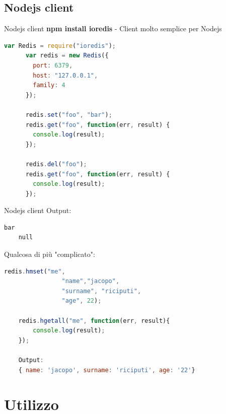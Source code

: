 \documentclass[xcolor=dvipsnames]{beamer}
\begin{document}
\subsection{Nodejs client}
\begin{frame}[fragile]{Nodejs client}
  \textbf{npm install ioredis} - Client molto semplice per Nodejs \\
  \begin{lstlisting}[language=JavaScript]
      var Redis = require("ioredis");
      var redis = new Redis({
        port: 6379,
        host: "127.0.0.1",
        family: 4
      });

      redis.set("foo", "bar");
      redis.get("foo", function(err, result) {
        console.log(result);
      });

      redis.del("foo");
      redis.get("foo", function(err, result) {
        console.log(result);
      });
  \end{lstlisting}

\end{frame}

\begin{frame}[fragile]{Nodejs client}
  Output:
  \begin{lstlisting}[language=bash]
    bar
    null
  \end{lstlisting}

  Qualcosa di più "complicato":
  \begin{lstlisting}[language=JavaScript]
    redis.hmset("me",
                "name","jacopo",
                "surname", "riciputi",
                "age", 22);

    redis.hgetall("me", function(err, result){
        console.log(result);
    });

    Output:
    { name: 'jacopo', surname: 'riciputi', age: '22'}
  \end{lstlisting}
\end{frame}


\section{Utilizzo}
  \begin{frame}
    \begin{block}{\centering \huge \insertsectionhead}
    \end{block}
  \end{frame}
\end{document}
